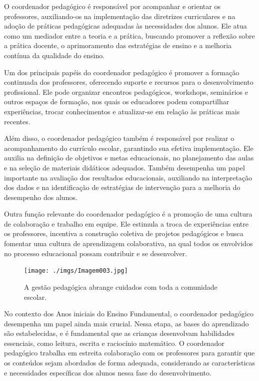 O coordenador pedagógico é responsável por acompanhar e orientar os
professores, auxiliando-os na implementação das diretrizes curriculares
e na adoção de práticas pedagógicas adequadas às necessidades dos
alunos. Ele atua como um mediador entre a teoria e a prática, buscando
promover a reflexão sobre a prática docente, o aprimoramento das
estratégias de ensino e a melhoria contínua da qualidade do ensino.

Um dos principais papéis do coordenador pedagógico é promover a formação
continuada dos professores, oferecendo suporte e recursos para o
desenvolvimento profissional. Ele pode organizar encontros pedagógicos,
workshops, seminários e outros espaços de formação, nos quais os
educadores podem compartilhar experiências, trocar conhecimentos e
atualizar-se em relação às práticas mais recentes.

Além disso, o coordenador pedagógico também é responsável por realizar o
acompanhamento do currículo escolar, garantindo sua efetiva
implementação. Ele auxilia na definição de objetivos e metas
educacionais, no planejamento das aulas e na seleção de materiais
didáticos adequados. Também desempenha um papel importante na avaliação
dos resultados educacionais, auxiliando na interpretação dos dados e na
identificação de estratégias de intervenção para a melhoria do
desempenho dos alunos.

Outra função relevante do coordenador pedagógico é a promoção de uma
cultura de colaboração e trabalho em equipe. Ele estimula a troca de
experiências entre os professores, incentiva a construção coletiva de
projetos pedagógicos e busca fomentar uma cultura de aprendizagem
colaborativa, na qual todos os envolvidos no processo educacional possam
contribuir e se desenvolver.

\begin{figure}
\centering
\texttt{[image: ./imgs/Imagem003.jpg]}
\caption{A gestão pedagógica abrange cuidados com toda a comunidade
escolar.}
\end{figure}

No contexto dos Anos iniciais do Ensino Fundamental, o coordenador
pedagógico desempenha um papel ainda mais crucial. Nessa etapa, as bases
do aprendizado são estabelecidas, e é fundamental que as crianças
desenvolvam habilidades essenciais, como leitura, escrita e raciocínio
matemático. O coordenador pedagógico trabalha em estreita colaboração
com os professores para garantir que os conteúdos sejam abordados de
forma adequada, considerando as características e necessidades
específicas dos alunos nessa fase do desenvolvimento.

